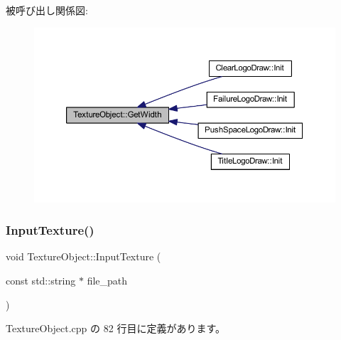 被呼び出し関係図\+:\nopagebreak
\begin{figure}[H]
\begin{center}
\leavevmode
\includegraphics[width=350pt]{class_texture_object_a72c079770e7e4355b6481d28a0a472ac_icgraph}
\end{center}
\end{figure}
\mbox{\label{class_texture_object_a93196fc80c026672b8a15cec21ef5dea}} 
\subsubsection{\texorpdfstring{Input\+Texture()}{InputTexture()}}
{\footnotesize\ttfamily void Texture\+Object\+::\+Input\+Texture (\begin{DoxyParamCaption}\item[{const std\+::string $\ast$}]{file\+\_\+path }\end{DoxyParamCaption})\hspace{0.3cm}{\ttfamily [private]}}



 Texture\+Object.\+cpp の 82 行目に定義があります。

